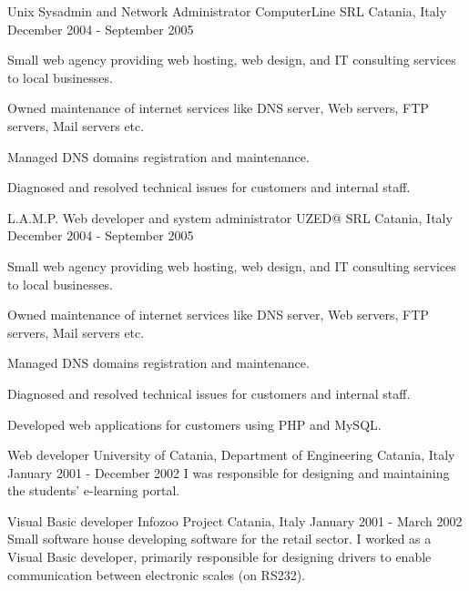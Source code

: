 \begin{cventries}
  \cventry
  {Unix Sysadmin and Network Administrator}
  {ComputerLine SRL}
  {Catania, Italy}
  {December 2004 - September 2005}
  {
    Small web agency providing web hosting, web design, and IT consulting services to local businesses.
    \begin{cvitems}
      \item Owned maintenance of internet services like DNS server, Web servers, FTP servers, Mail servers etc.
      \item Managed DNS domains registration and maintenance.
      \item Diagnosed and resolved technical issues for customers and internal staff.
    \end{cvitems}
  }

  \cventry
  {L.A.M.P. Web developer and system administrator}
  {UZED@ SRL}
  {Catania, Italy}
  {December 2004 - September 2005}
  {
    Small web agency providing web hosting, web design, and IT consulting services to local businesses.
    \begin{cvitems}
      \item Owned maintenance of internet services like DNS server, Web servers, FTP servers, Mail servers etc.
      \item Managed DNS domains registration and maintenance.
      \item Diagnosed and resolved technical issues for customers and internal staff.
      \item Developed web applications for customers using PHP and MySQL.
    \end{cvitems}
  }

  \cventry
  {Web developer}
  {University of Catania, Department of Engineering}
  {Catania, Italy}
  {January 2001 - December 2002}
  {
    I was responsible for designing and maintaining the students' e-learning portal.
  }

  \cventry
  {Visual Basic developer}
  {Infozoo Project}
  {Catania, Italy}
  {January 2001 - March 2002}
  {
    Small software house developing software for the retail sector.
    I worked as a Visual Basic developer, primarily responsible for designing drivers to enable
    communication between electronic scales (on RS232).
  }

\end{cventries}
